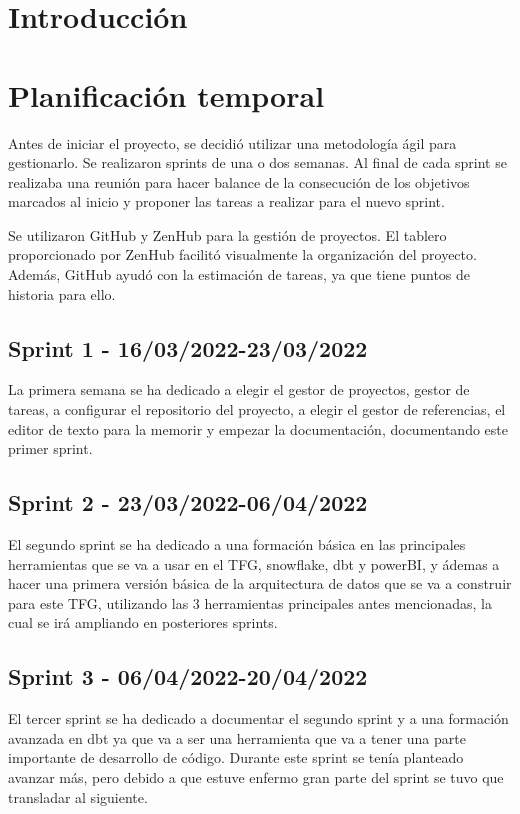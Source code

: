 
\section{Introducción}

\section{Planificación temporal}
Antes de iniciar el proyecto, se decidió utilizar una metodología ágil para gestionarlo.
Se realizaron sprints de una o dos semanas. Al final de cada sprint se realizaba una reunión para hacer balance de la consecución de los objetivos marcados al inicio y proponer las tareas a realizar para el nuevo sprint.

Se utilizaron GitHub y ZenHub para la gestión de proyectos. El tablero proporcionado por ZenHub facilitó visualmente la organización del proyecto. Además, GitHub ayudó con la estimación de tareas, ya que tiene puntos de historia para ello.

\subsection{Sprint 1 - 16/03/2022-23/03/2022}
La primera semana se ha dedicado a elegir el gestor de proyectos, gestor de tareas, a configurar el repositorio del proyecto, a elegir el gestor de referencias, el editor de texto para la memorir y empezar la documentación, documentando este primer sprint.
\subsection{Sprint 2 - 23/03/2022-06/04/2022}
El segundo sprint se ha dedicado a una formación básica en las principales herramientas que se va a usar en el TFG, snowflake, dbt y powerBI, y ádemas a hacer una primera versión básica de la arquitectura de datos que se va a construir para este TFG, utilizando las 3 herramientas principales antes mencionadas, la cual se irá ampliando en posteriores sprints. 
\subsection{Sprint 3 - 06/04/2022-20/04/2022}
El tercer sprint se ha dedicado a documentar el segundo sprint y a una formación avanzada en dbt ya que va a ser una herramienta que va a tener una parte importante de desarrollo de código. Durante este sprint se tenía planteado avanzar más, pero debido a que estuve enfermo gran parte del sprint se tuvo que transladar al siguiente.
